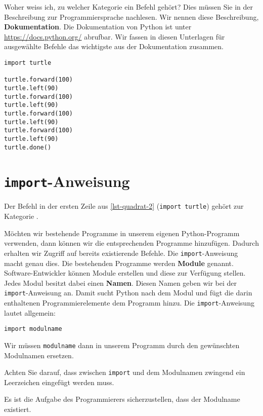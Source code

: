 Woher weiss ich, zu welcher Kategorie ein Befehl gehört? Dies müssen Sie in der Beschreibung zur Programmiersprache nachlesen. Wir nennen diese Beschreibung, \textbf{Dokumentation}. Die Dokumentation von Python ist unter \url{https://docs.python.org/} abrufbar. Wir fassen in diesen Unterlagen für ausgewählte Befehle das wichtigste aus der Dokumentation zusammen.

\begin{lstlisting}[caption={Python-Programm für ein Quadrat.}, label=lst-quadrat-2]
import turtle

turtle.forward(100)
turtle.left(90)
turtle.forward(100)
turtle.left(90)
turtle.forward(100)
turtle.left(90)
turtle.forward(100)
turtle.left(90)
turtle.done()
\end{lstlisting}

\section{\lstinline{import}-Anweisung}

Der Befehl in der ersten Zeile aus \autoref{lst-quadrat-2} (\lstinline{import turtle}) gehört zur Kategorie .

Möchten wir bestehende Programme in unserem eigenen Python-Programm verwenden, dann können wir die entsprechenden Programme hinzufügen. Dadurch erhalten wir Zugriff auf bereits existierende Befehle. Die \lstinline{import}-Anweisung macht genau dies. Die bestehenden Programme werden \textbf{Module} genannt. Software-Entwickler können Module erstellen und diese zur Verfügung stellen. Jedes Modul besitzt dabei einen \textbf{Namen}. Diesen Namen geben wir bei der \lstinline{import}-Anweisung an. Damit sucht Python nach dem Modul und fügt die darin enthaltenen Programmierelemente dem Programm hinzu. Die \lstinline{import}-Anweisung lautet allgemein:

\begin{center}
\lstinline{import modulname}	
\end{center}

Wir müssen \lstinline{modulname} dann in unserem Programm durch den gewünschten Modulnamen ersetzen. 

\begin{important}
Achten Sie darauf, dass zwischen \lstinline{import}  und dem Modulnamen zwingend ein Leerzeichen eingefügt werden muss.
\end{important}

Es ist die Aufgabe des Programmierers sicherzustellen, dass der Modulname existiert.

